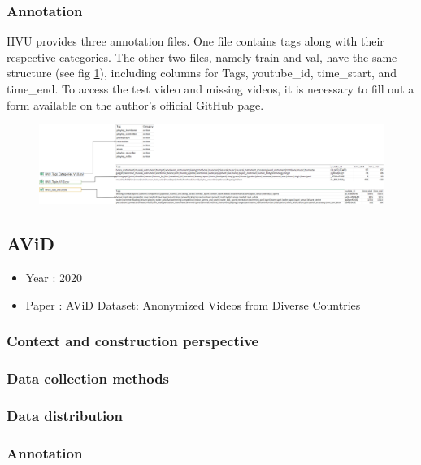 \documentclass[10pt,onecolumn,letterpaper]{article}
\begin{document}
\subsubsection{Annotation}

HVU provides three annotation files. One file contains tags along with their respective categories. The other two files, namely train and val, have the same structure (see fig \ref{fig:untitled-diagram5}), including columns for Tags, youtube\_id, time\_start, and time\_end. To access the test video and missing videos, it is necessary to fill out a form available on the author's official GitHub page.

\begin{figure}[h]
	\centering
	\includegraphics[width=0.7\linewidth]{"fig_info/fig5/Untitled Diagram.drawio"}
	\caption{}
	\label{fig:untitled-diagram5}
\end{figure}

\subsection{AViD}

\begin{itemize}
	\item Year : 2020
	\item Paper : AViD Dataset: Anonymized Videos from Diverse Countries \cite{AViD}
\end{itemize}

\subsubsection{Context and construction perspective}
\subsubsection{Data collection methods}
\subsubsection{Data distribution}
\subsubsection{Annotation}
\end{document}

